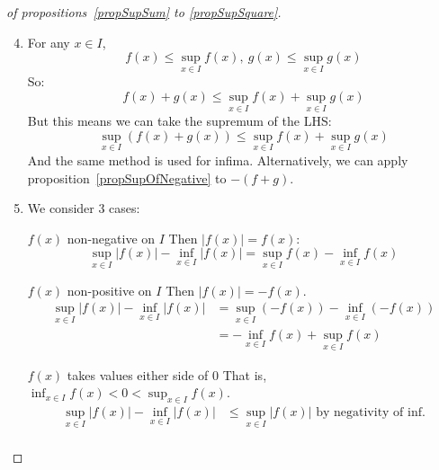 \documentclass[../Main.tex]{subfiles}
\begin{document}
\begin{proof}[of propositions~\ref{propSupSum} to \ref{propSupSquare}]
    \begin{enumerate}
        \setcounter{enumi}{3} %
        \item For any $x \in I$,
            \begin{equation*}
                f(x) \leq \sup_{x \in I} f(x),~g(x) \leq \sup_{x \in I} g(x)
            \end{equation*}
            So:
            \begin{equation*}
                f(x) + g(x) \leq \sup_{x \in I} f(x) + \sup_{x \in I} g(x)
            \end{equation*}
            But this means we can take the supremum of the LHS:
            \begin{equation*}
                \sup_{x \in I} (f(x) + g(x)) \leq \sup_{x \in I} f(x) + \sup_{x \in I} g(x)
            \end{equation*}
            And the same method is used for infima. Alternatively, we can apply proposition~\ref{propSupOfNegative} to $-(f + g)$.
        \item We consider 3 cases:
            \begin{case}{$f(x)$ non-negative on $I$}
                Then $|f(x)| = f(x)$:
                \begin{equation*}
                    \sup_{x \in I} |f(x)| - \inf_{x \in I} |f(x)| = \sup_{x \in I} f(x) - \inf_{x \in I} f(x)
                \end{equation*}
            \end{case}
            \begin{case}{$f(x)$ non-positive on $I$}
                Then $|f(x)| = -f(x)$.
                \begin{align*}
                    \sup_{x \in I} |f(x)| - \inf_{x \in I} |f(x)| &= \sup_{x \in I} (-f(x)) - \inf_{x \in I} (-f(x)) \\
                    &= -\inf_{x \in I} f(x) + \sup_{x \in I} f(x)
               \end{align*}
            \end{case}
            \begin{case}{$f(x)$ takes values either side of 0}
                That is, $\inf_{x \in I} f(x) < 0 < \sup_{x \in I} f(x)$.
                \begin{align*}
                    \sup_{x \in I} |f(x)| - \inf_{x \in I} |f(x)| &\leq \sup_{x \in I} |f(x)| \text{ by negativity of inf.} \\

\end{align*}
\end{case}
\end{enumerate}
\end{proof}
\end{document}

